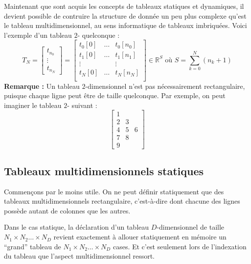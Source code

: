 \documentclass[../../../main.tex]{subfiles}
\begin{document}
Maintenant que sont acquis les concepts de tableaux statiques et dynamiques, il devient possible de contruire la structure de donnée un peu plus complexe qu'est le tableau multidimensionnel, au sens informatique de tableaux imbriquées. Voici l'exemple d'un tableau $2$- quelconque :
\[
T_{N} = \left[{\begin{array}{c}
	t_{n_{0}}\\
	\vdots\\
	t_{n_{N}}
\end{array}
}\right] = \left[ {\begin{array}{ccccc}
		t_{0}[0] & \hdots & t_{0}[n_{0}]\\
		t_{1}[0] & \hdots & t_{1}[n_{1}]\\
		\vdots & & \vdots\\
		t_{N}[0] & \hdots & t_{N}[n_{N}]\\
	\end{array} } \right]
	\in{\mathbb{R}^{S}} \text{ où } S = \displaystyle\sum_{k=0}^{N}(n_{k} + 1)
\]
\textbf{Remarque :} Un tableau $2$-dimensionnel n'est pas nécessairement rectangulaire, puisque chaque ligne peut être de taille quelconque. Par exemple, on peut imaginer le tableau $2$- suivant :
\begin{equation}
	\label{math:triangle_2d_array}
	\left[ {\begin{array}{ccccc}
		1 \\
		2 & 3 \\
		4 & 5 & 6 \\
		7 & 8 \\
		9
	\end{array} } \right]
\end{equation}
\subsection{Tableaux multidimensionnels statiques}
Commençons par le moins utile. On ne peut définir statiquement que des tableaux multidimensionnels rectangulaire, c'est-à-dire dont chacune des lignes possède autant de colonnes que les autres.
 
Dans le cas statique, la déclaration d'un tableau $D$-dimensionnel de taille $N_{1}\times{N_{2}}\dots\times{N_{D}}$ revient exactement à allouer statiquement en mémoire un ``grand'' tableau de $N_{1}\times{N_{2}}\dots\times{N_{D}}$ cases. Et c'est seulement lors de l'indexation du tableau que l'aspect multidimensionnel ressort.
 
\end{document}
